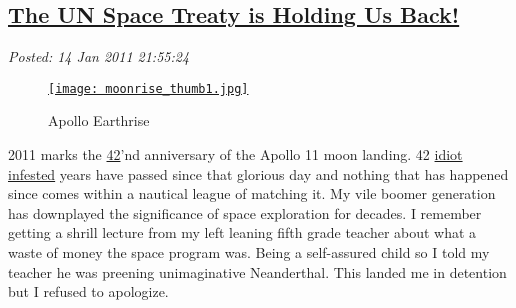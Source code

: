 %

\subsection*{\href{https://bakerjd99.wordpress.com/2011/01/14/the-un-space-treaty-is-holding-us-back/}{The UN Space Treaty is Holding Us Back!}}


\noindent\emph{Posted: 14 Jan 2011 21:55:24}
\vspace{6pt}




\captionsetup[figure]{labelformat=empty}
\begin{figure}[htbp]
\centering
\href{http://bakerjd99.files.wordpress.com/2011/01/moonrise1.jpg}{\texttt{[image: moonrise\_thumb1.jpg]}}
\caption{Apollo  Earthrise}
\label{fig:1022X0}
\end{figure} 

2011 marks the \href{http://www.youtube.com/watch?v=aboZctrHfK8}{42}'nd
anniversary of the Apollo 11 moon landing. 42
\href{http://www.newser.com/story/comments/64908/moon-landing-denier-exposed-as-a-cheat.html}{idiot
infested} years have passed since that glorious day and nothing that has
happened since comes within a nautical league of matching it. My vile
boomer generation has downplayed the significance of space exploration
for decades. I remember getting a shrill lecture from my left leaning
fifth grade teacher about what a waste of money the space program was.
Being a self-assured child so I told my teacher he was preening
unimaginative Neanderthal. This landed me in detention but I refused to
apologize.

